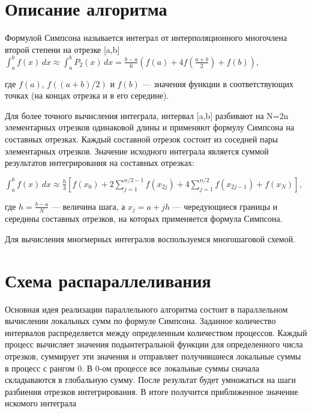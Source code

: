 \documentclass{report}
\begin{document}
\section*{Описание алгоритма}
\par 
Формулой Симпсона называется интеграл от интерполяционного многочлена второй степени на отрезке [a,b]
$\displaystyle {\int_{a}^{b} f(x) \, dx }\approx {\int_{a}^{b} P_{2}(x) \, dx}=\frac  {b-a}{6}{\left(f(a)+4f\left({\frac  {a+b}{2}}\right)+f(b)\right)}$,
\par где ${\displaystyle f(a)}$, ${\displaystyle f((a+b)/2)}$ и ${\displaystyle f(b)}$ — значения функции в соответствующих точках (на концах отрезка и в его середине).
\par Для более точного вычисления интеграла, интервал [a,b] разбивают на N=2n элементарных отрезков одинаковой длины и применяют формулу Симпсона на составных отрезках. Каждый составной отрезок состоит из соседней пары элементарных отрезков. Значение исходного интеграла является суммой результатов интегрирования на составных отрезках:

${\displaystyle \int _{a}^{b}f(x)\,dx\approx {\frac {h}{3}}\left[f(x_{0})+2\sum _{j=1}^{n/2-1}f(x_{2j})+4\sum _{j=1}^{n/2}f(x_{2j-1})+f(x_{N})\right],}$
\par где ${\displaystyle h={\frac {b-a}{N}}}$ — величина шага, а ${\displaystyle x_{j}=a+jh}$ — чередующиеся границы и середины составных отрезков, на которых применяется формула Симпсона.
 \par Для вычисления многмерных интегралов воспользуемся многошаговой схемой.
\newpage

\section*{Схема распараллеливания}
\par 
Основная идея реализации параллельного алгоритма состоит в параллельном вычислении локальных сумм по формуле Симпсона. Заданное количество интервалов распределяется между определенным количеством процессов. Каждый процесс
вычисляет значения подынтегральной функции для определенного числа отрезков, суммирует эти значения и отправляет получившиеся локальные суммы в процесс с рангом 0.
В 0-ом процессе все локальные суммы сначала складываются в глобальную сумму. После
результат будет умножаться на шаги разбиения отрезков интегрирования. В итоге получится приближенное значение искомого интеграла
\newpage
\end{document}
